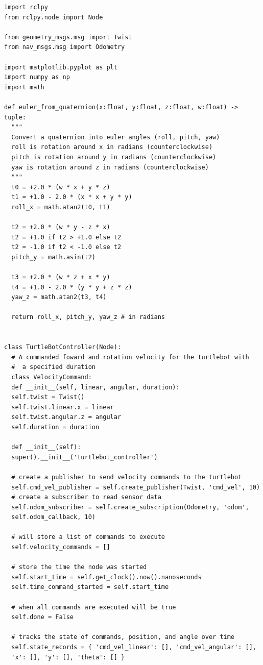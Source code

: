 \documentclass{article}
\begin{document}
\begin{verbatim}
import rclpy
from rclpy.node import Node

from geometry_msgs.msg import Twist
from nav_msgs.msg import Odometry

import matplotlib.pyplot as plt
import numpy as np
import math

def euler_from_quaternion(x:float, y:float, z:float, w:float) -> tuple:
  """
  Convert a quaternion into euler angles (roll, pitch, yaw)
  roll is rotation around x in radians (counterclockwise)
  pitch is rotation around y in radians (counterclockwise)
  yaw is rotation around z in radians (counterclockwise)
  """
  t0 = +2.0 * (w * x + y * z)
  t1 = +1.0 - 2.0 * (x * x + y * y)
  roll_x = math.atan2(t0, t1)
   
  t2 = +2.0 * (w * y - z * x)
  t2 = +1.0 if t2 > +1.0 else t2
  t2 = -1.0 if t2 < -1.0 else t2
  pitch_y = math.asin(t2)
   
  t3 = +2.0 * (w * z + x * y)
  t4 = +1.0 - 2.0 * (y * y + z * z)
  yaw_z = math.atan2(t3, t4)
   
  return roll_x, pitch_y, yaw_z # in radians


class TurtleBotController(Node):
  # A commanded foward and rotation velocity for the turtlebot with
  #  a specified duration
  class VelocityCommand:
  def __init__(self, linear, angular, duration):
  self.twist = Twist()
  self.twist.linear.x = linear
  self.twist.angular.z = angular
  self.duration = duration

  def __init__(self):
  super().__init__('turtlebot_controller')

  # create a publisher to send velocity commands to the turtlebot
  self.cmd_vel_publisher = self.create_publisher(Twist, 'cmd_vel', 10)
  # create a subscriber to read sensor data
  self.odom_subscriber = self.create_subscription(Odometry, 'odom', 
  self.odom_callback, 10)

  # will store a list of commands to execute
  self.velocity_commands = []

  # store the time the node was started
  self.start_time = self.get_clock().now().nanoseconds
  self.time_command_started = self.start_time

  # when all commands are executed will be true
  self.done = False

  # tracks the state of commands, position, and angle over time
  self.state_records = { 'cmd_vel_linear': [], 'cmd_vel_angular': [], 
  'x': [], 'y': [], 'theta': [] }



\end{verbatim}
\end{document}
